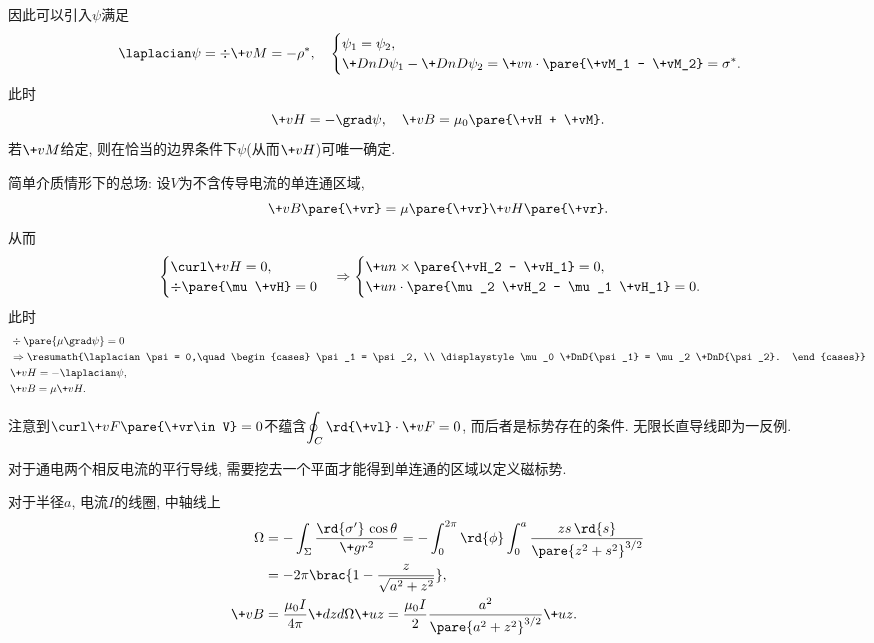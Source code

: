 \documentclass[hidelinks]{ctexart}
\begin{document}
\begin{cenum}
    因此可以引入$\psi$满足
    \[ \laplacian \psi = \div \+vM = -\rho^*,\quad \begin{cases}
        \psi_1 = \psi_2, \\
        \displaystyle \+DnD{\psi_1} - \+DnD{\psi_2} = \+vn\cdot \pare{\+vM_1 - \+vM_2} = \sigma^*.
    \end{cases} \]
    此时
    \[ \+vH = -\grad \psi,\quad \+vB = \mu_0\pare{\+vH + \+vM}. \]
    若$\+vM$给定, 则在恰当的边界条件下$\psi$(从而$\+vH$)可唯一确定.
    \item 简单介质情形下的总场: 设$V$为不含传导电流的单连通区域,
    \[ \+vB\pare{\+vr} = \mu\pare{\+vr}\+vH\pare{\+vr}. \]
    从而
    \[ \begin{cases}
        \curl \+vH = 0, \\
        \div \pare{\mu \+vH} = 0
    \end{cases} \Rightarrow \begin{cases}
        \+un\times \pare{\+vH_2 - \+vH_1} = 0, \\
        \+un\cdot \pare{\mu_2 \+vH_2 - \mu_1 \+vH_1} = 0.
    \end{cases} \]
    此时
    \begin{align*}
        & \div \pare{\mu \grad \psi} = 0 \\
        & \Rightarrow \resumath{\laplacian \psi = 0,\quad \begin{cases}
            \psi_1 = \psi_2, \\
            \displaystyle \mu_0 \+DnD{\psi_1} = \mu_2 \+DnD{\psi_2}.
        \end{cases}} \\
        & \+vH = -\laplacian \psi, \\
        & \+vB = \mu \+vH.
    \end{align*}
\end{cenum}
\begin{remark}
    注意到$\curl \+vF\pare{\+vr\in V} = 0$不蕴含$\displaystyle \oint_C \rd{\+vl}\cdot \+vF = 0$, 而后者是标势存在的条件. 无限长直导线即为一反例.
\end{remark}
\begin{ex}
    对于通电两个相反电流的平行导线, 需要挖去一个平面才能得到单连通的区域以定义磁标势.
\end{ex}
\begin{sample}
    \begin{ex}
        对于半径$a$, 电流$I$的线圈, 中轴线上
        \begin{align*}
            \Omega &= -\int_{\Sigma} \frac{\rd{\sigma'}\, \cos\theta}{\+gr^2} = -\int_0^{2\pi} \rd{\phi} \int_0^a \frac{zs\,\rd{s}}{\pare{z^2+s^2}^{3/2}} \\
            &= -2\pi \brac{1-\frac{z}{\sqrt{a^2+z^2}}}, \\
            \+vB &= \frac{\mu_0 I}{4\pi}\+dzd\Omega \+uz = \frac{\mu_0 I}{2}\frac{a^2}{\pare{a^2+z^2}^{3/2}}\+uz.
        \end{align*}
    \end{ex}
\end{sample}
\end{document}
